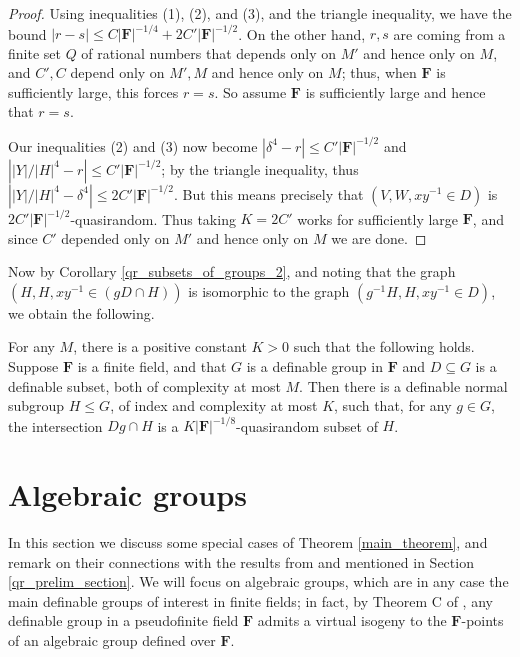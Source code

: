 \documentclass[10pt]{article}
\begin{document}
{\begin{proof}
    Using inequalities (1), (2), and (3), and the triangle inequality, we have the bound $|r-s|\leqslant C|\mathbf{F}|^{-1/4}+2C'|\mathbf{F}|^{-1/2}$. On the other hand, $r,s$ are coming from a finite set $Q$ of rational numbers that depends only on $M'$ and hence only on $M$, and $C',C$ depend only on $M',M$ and hence only on $M$; thus, when $\mathbf{F}$ is sufficiently large, this forces $r=s$. So assume $\mathbf{F}$ is sufficiently large and hence that $r=s$.
    
    Our inequalities (2) and (3) now become $|\delta^4-r|\leqslant C'|\mathbf{F}|^{-1/2}$ and $\left||Y|/|H|^4-r\right|\leqslant C'|\mathbf{F}|^{-1/2}$; by the triangle inequality, thus $\left||Y|/|H|^4-\delta^4\right|\leqslant 2C'|\mathbf{F}|^{-1/2}$. But this means precisely that $(V,W,xy^{-1}\in D)$ is $2C'|\mathbf{F}|^{-1/2}$-quasirandom. Thus taking $K=2C'$ works for sufficiently large $\mathbf{F}$, and since $C'$ depended only on $M'$ and hence only on $M$ we are done.
\end{proof}

Now by Corollary \ref{qr_subsets_of_groups_2}, and noting that the graph $(H,H,xy^{-1}\in (gD\cap H))$ is isomorphic to the graph $(g^{-1}H,H,xy^{-1}\in D)$, we obtain the following.

\begin{corollary}\label{main_theorem_fourier}
    For any $M$, there is a positive constant $K>0$ such that the following holds. Suppose $\mathbf{F}$ is a finite field, and that $G$ is a definable group in $\mathbf{F}$ and $D\subseteq G$ is a definable subset, both of complexity at most $M$. Then there is a definable normal subgroup $H\leqslant G$, of index and complexity at most $K$, such that, for any $g\in G$, the intersection $Dg\cap H$ is a $K|\mathbf{F}|^{-1/8}$-quasirandom subset of $H$.
 \end{corollary}

 \section{Algebraic groups}\label{special_cases_sec}
In this section we discuss some special cases of Theorem \ref{main_theorem}, and remark on their connections with the results from \cite{green} and \cite{gowers_groups} mentioned in Section \ref{qr_prelim_section}. We will focus on algebraic groups, which are in any case the main definable groups of interest in finite fields; in fact, by Theorem C of \cite{hrushovski_pillay}, any definable group in a pseudofinite field $\mathbf{F}$ admits a virtual isogeny to the $\mathbf{F}$-points of an algebraic group defined over $\mathbf{F}$.

}
\end{document}
